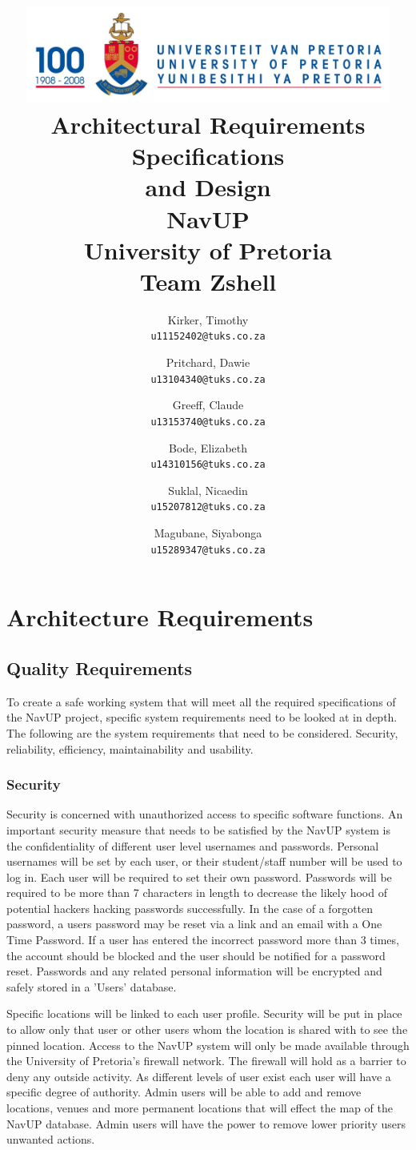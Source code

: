 \documentclass{article}
\title{\includegraphics[width=12cm]{Eeufeeslogo.jpg} \\
	\vspace{1.0cm}
	Architectural Requirements Specifications \\ 
	and Design \\
	\vspace{0.5cm}
	NavUP \\
	University of Pretoria \\
	\vspace{0.5cm}
	\vspace{8.0cm}
	Team Zshell\\
	\vspace{0.5cm}
}
\author{
	Kirker, Timothy\\
	\texttt{u11152402@tuks.co.za}
	\and
	Pritchard, Dawie\\
	\texttt{u13104340@tuks.co.za}
	\and
	Greeff, Claude\\
	\texttt{u13153740@tuks.co.za}
	\and
	Bode, Elizabeth\\
	\texttt{u14310156@tuks.co.za}
	\and
	Suklal, Nicaedin\\
	\texttt{u15207812@tuks.co.za}
	\and
	Magubane, Siyabonga\\
	\texttt{u15289347@tuks.co.za}
	\vspace{0.5cm}
	}
\begin{document}
	\maketitle
	\thispagestyle{empty}
	\clearpage
	
	\newpage
	\thispagestyle{empty}
	\tableofcontents
	\clearpage
	
	\newpage
	\section{Architecture Requirements}
		\subsection{Quality Requirements}
		 To create a safe working system that will meet all the required specifications of the NavUP project, specific system requirements need to be looked at in depth. The following are the system requirements that need to be considered. Security, reliability, efficiency, maintainability and usability.
		 
		 \subsubsection{Security}
		 Security is concerned with unauthorized access to specific software functions. An important security measure that needs to be satisfied by the NavUP system is the confidentiality of different user level usernames and passwords. Personal usernames will be set by each user, or their student/staff number will be used to log in. Each user will be required to set their own password. Passwords will be required to be more than 7 characters in length to decrease the likely hood of potential hackers hacking passwords successfully. In the case of a forgotten password, a users password may be reset via a link and an email with a One Time Password. If a user has entered the incorrect password more than 3 times, the account should be blocked and the user should be notified for a password reset. Passwords and any related personal information will be encrypted and safely stored in a 'Users' database.
		 
		  Specific locations will be linked to each user profile. Security will be put in place to allow only that user or other users whom the location is shared with to see the pinned location. Access to the NavUP system will only be made available through the University of Pretoria's firewall network. The firewall will hold as a barrier to deny any outside activity. As different levels of user exist each user will have a specific degree of authority. Admin users will be able to add and remove locations, venues and more permanent locations that will effect the map of the NavUP database. Admin users will have the power to remove lower priority users unwanted actions.
		 
\end{document}

